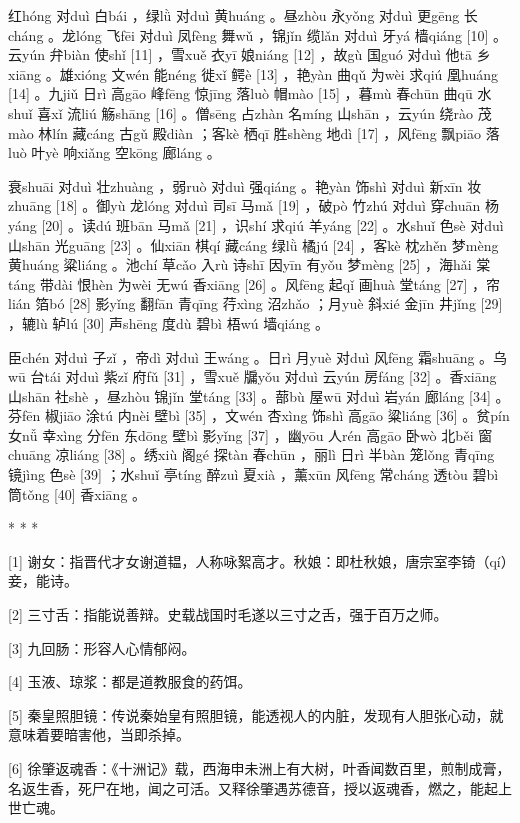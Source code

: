 \documentclass[12pt,UTF8]{ctexbook}
\begin{document}
红hóng 对duì 白bái ，绿lǜ 对duì 黄huáng 。昼zhòu 永yǒng 对duì 更gēng 长cháng 。龙lóng 飞fēi 对duì 凤fèng 舞wǔ ，锦jǐn 缆lǎn 对duì 牙yá 樯qiáng [10] 。云yún 弁biàn 使shǐ [11] ，雪xuě 衣yī 娘niáng [12] ，故gù 国guó 对duì 他tā 乡xiāng 。雄xióng 文wén 能néng 徙xǐ 鳄è [13] ，艳yàn 曲qǔ 为wèi 求qiú 凰huáng [14] 。九jiǔ 日rì 高gāo 峰fēng 惊jīng 落luò 帽mào [15] ，暮mù 春chūn 曲qū 水shuǐ 喜xǐ 流liú 觞shāng [16] 。僧sēng 占zhàn 名míng 山shān ，云yún 绕rào 茂mào 林lín 藏cáng 古gǔ 殿diàn ；客kè 栖qī 胜shèng 地dì [17] ，风fēng 飘piāo 落luò 叶yè 响xiǎng 空kōng 廊láng 。

衰shuāi 对duì 壮zhuàng ，弱ruò 对duì 强qiáng 。艳yàn 饰shì 对duì 新xīn 妆zhuāng [18] 。御yù 龙lóng 对duì 司sī 马mǎ [19] ，破pò 竹zhú 对duì 穿chuān 杨yáng [20] 。读dú 班bān 马mǎ [21] ，识shí 求qiú 羊yáng [22] 。水shuǐ 色sè 对duì 山shān 光guāng [23] 。仙xiān 棋qí 藏cáng 绿lǜ 橘jú [24] ，客kè 枕zhěn 梦mèng 黄huáng 粱liáng 。池chí 草cǎo 入rù 诗shī 因yīn 有yǒu 梦mèng [25] ，海hǎi 棠táng 带dài 恨hèn 为wèi 无wú 香xiāng [26] 。风fēng 起qǐ 画huà 堂táng [27] ，帘lián 箔bó [28] 影yǐng 翻fān 青qīng 荇xìng 沼zhǎo ；月yuè 斜xié 金jīn 井jǐng [29] ，辘lù 轳lú [30] 声shēng 度dù 碧bì 梧wú 墙qiáng 。

臣chén 对duì 子zǐ ，帝dì 对duì 王wáng 。日rì 月yuè 对duì 风fēng 霜shuāng 。乌wū 台tái 对duì 紫zǐ 府fǔ [31] ，雪xuě 牖yǒu 对duì 云yún 房fáng [32] 。香xiāng 山shān 社shè ，昼zhòu 锦jǐn 堂táng [33] 。蔀bù 屋wū 对duì 岩yán 廊láng [34] 。芬fēn 椒jiāo 涂tú 内nèi 壁bì [35] ，文wén 杏xìng 饰shì 高gāo 粱liáng [36] 。贫pín 女nǚ 幸xìng 分fēn 东dōng 壁bì 影yǐng [37] ，幽yōu 人rén 高gāo 卧wò 北běi 窗chuāng 凉liáng [38] 。绣xiù 阁gé 探tàn 春chūn ，丽lì 日rì 半bàn 笼lǒng 青qīng 镜jìng 色sè [39] ；水shuǐ 亭tíng 醉zuì 夏xià ，薰xūn 风fēng 常cháng 透tòu 碧bì 筒tǒng [40] 香xiāng 。



* * *



[1] 谢女：指晋代才女谢道韫，人称咏絮高才。秋娘：即杜秋娘，唐宗室李锜（qí）妾，能诗。

[2] 三寸舌：指能说善辩。史载战国时毛遂以三寸之舌，强于百万之师。

[3] 九回肠：形容人心情郁闷。

[4] 玉液、琼浆：都是道教服食的药饵。

[5] 秦皇照胆镜：传说秦始皇有照胆镜，能透视人的内脏，发现有人胆张心动，就意味着要暗害他，当即杀掉。

[6] 徐肇返魂香：《十洲记》载，西海申未洲上有大树，叶香闻数百里，煎制成膏，名返生香，死尸在地，闻之可活。又释徐肇遇苏德音，授以返魂香，燃之，能起上世亡魂。
\end{document}
